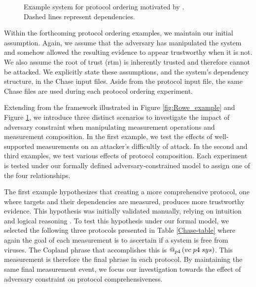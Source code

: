 \documentclass[runningheads]{llncs}
\theoremstyle{definition}
\begin{document}
\begin{figure}[htbp]
    \centering
    
    \captionsetup{justification=centering,margin=1cm}
    \caption[Example system for protocol ordering]{Example system for protocol ordering motivated by \cite{Rowe:2016:Confining}.\\ Dashed lines represent dependencies. }
    \label{fig:ord-system}
\end{figure}

Within the forthcoming protocol ordering examples, we maintain our initial assumption. Again, we assume that the adversary has manipulated the system and somehow allowed the resulting evidence to appear trustworthy when it is not. We also assume the root of trust (rtm) is inherently trusted and therefore cannot be attacked. We explicitly state these assumptions, and the system's dependency structure, in the Chase input files. Aside from the protocol input file, the same Chase files are used during each protocol ordering experiment. 

Extending from the framework illustrated in Figure \ref{fig:Rowe_example} and Figure \ref{fig:ord-system}, we introduce three distinct scenarios to investigate the impact of adversary constraint when manipulating measurement operations and measurement composition. In the first example, we test the effects of well-supported measurements on an attacker's difficultly of attack. In the second and third examples, we test various effects of protocol composition. Each experiment is tested under our formally defined adversary-constrained model to assign one of the four relationships.

The first example hypothesizes that creating a more comprehensive protocol, one where targets and their dependencies are measured, produces more trustworthy evidence. This hypothesis was initially validated manually, relying on intuition and logical reasoning \cite{Rowe:2016:Confining}. To test this hypothesis under our formal model, we selected the following three protocols presented in Table \ref{Chase-table} where again the goal of each measurement is to ascertain if a system is free from viruses. The Copland phrase that accomplishes this is $\mathop{@_{p4}}{(vc\; p4\; sys)}$. This measurement is therefore the final phrase in each protocol. By maintaining the same final measurement event, we focus our investigation towards the effect of adversary constraint on protocol comprehensiveness.
\end{document}
